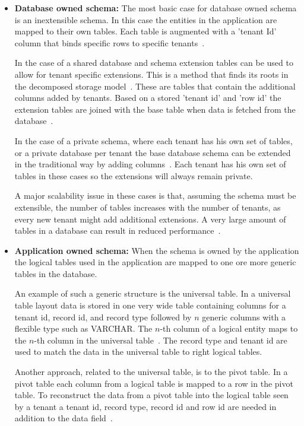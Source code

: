 \begin{itemize}
	\item \textbf{Database owned schema:} The most basic case for database owned schema is an inextensible schema.
		In this case the entities in the application are mapped to their own tables.
		Each table is augmented with a 'tenant Id' column that binds specific rows to specific tenants~\cite{aulbach2008multi}.

		In the case of a shared database and schema extension tables can be used to allow for tenant specific extensions.
		This is a method that finds its roots in the decomposed storage model~\cite{copeland1985decomposition}.
		These are tables that contain the additional columns added by tenants. 
		Based on a stored 'tenant id' and 'row id' the extension tables are joined with the base table when data is fetched from the database~\cite{aulbach2008multi}.

		In the case of a private schema, where each tenant has his own set of tables, or a private database per tenant the base database schema can be extended in the traditional way by adding columns~\cite{aulbach2009comparison}.
		Each tenant has his own set of tables in these cases so the extensions will always remain private. 
	
		A major scalability issue in these cases is that, assuming the schema must be extensible, the number of tables increases with the number of tenants, as every new tenant might add additional extensions.
		A very large amount of tables in a database can result in reduced performance~\cite{aulbach2008multi}.
	\item \textbf{Application owned schema:} When the schema is owned by the application the logical tables used in the application are mapped to one ore more generic tables in the database.
		
		An example of such a generic structure is the universal table. 
		In a universal table layout data is stored in one very wide table containing columns for a tenant id, record id, and record type followed by $n$ generic columns with a flexible type such as VARCHAR.
		The $n$-th column of a logical entity maps to the $n$-th column in the universal table~\cite{aulbach2008multi}. The record type and tenant id are used to match the data in the universal table to right logical tables.

		Another approach, related to the universal table, is to the pivot table. 
		In a pivot table each column from a logical table is mapped to a row in the pivot table.
		To reconstruct the data from a pivot table into the logical table seen by a tenant a tenant id, record type, record id and row id are needed in addition to the data field~\cite{aulbach2008multi}.


\end{itemize}
